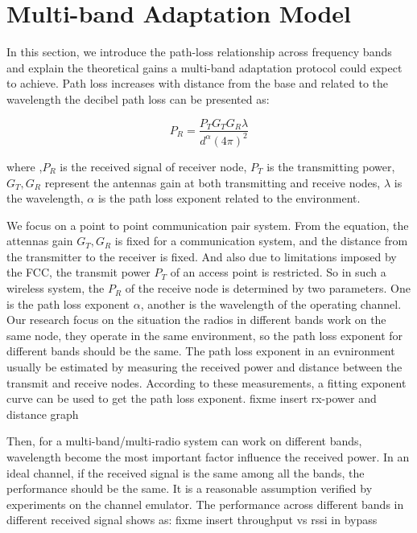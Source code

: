 \section{Multi-band Adaptation Model}
\label{sec:model}
In this section, we introduce the path-loss relationship across frequency bands and explain the theoretical gains a multi-band adaptation protocol could expect to achieve. Path loss increases with distance from the base and related to the wavelength the decibel path loss can be presented as:\cite{rappaport}

\begin{equation}
P_{R}=\frac{P_TG_TG_R\lambda}{d^\alpha(4\pi)^2}
\end{equation}

where ,$P_R$ is the received signal of receiver node, $P_T$ is the transmitting power, $G_T,G_R$ represent the antennas gain at both transmitting and receive nodes,
$\lambda$ is the wavelength, $\alpha$ is the path loss exponent related to the environment. 

We focus on a point to point communication pair system. 
From the equation, the attennas gain $G_T,G_R$ is fixed for a communication system, and the distance from the transmitter to the receiver is fixed.
And also due to limitations imposed by the FCC, the transmit power $P_T$ of an access point is restricted. 
So in such a wireless system, the $P_R$ of the receive node is determined by two parameters. One is the path loss exponent $\alpha$, another is the wavelength of the operating channel. 
Our research focus on the situation the radios in different bands work on the same node, they operate in the same environment, so the path loss exponent for different bands should be the same. 
The path loss exponent in an evnironment usually be estimated by measuring the received power and distance between the transmit and receive nodes. According to these measurements, a fitting exponent curve can be used to get the path loss exponent. fixme insert rx-power and distance graph 

Then, for a multi-band/multi-radio system can work on different bands, wavelength become the most important factor influence the received power.
In an ideal channel, if the received signal is the same among all the bands, the performance should be the same. It is a reasonable assumption verified by experiments on the channel emulator. The performance across different bands in different received signal shows as: {fixme insert throughput vs rssi in bypass}

